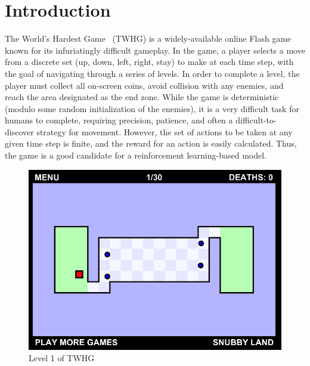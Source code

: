 \documentclass[12pt]{article}
\begin{document}
\section{Introduction}


The World's Hardest Game~\cite{game} (TWHG) is a widely-available online Flash game known for its infuriatingly difficult gameplay. In the game, a player selects a move from a discrete set (up, down, left, right, stay) to make at each time step, with the goal of navigating through a series of levels. In order to complete a level, the player must collect all on-screen coins, avoid collision with any enemies, and reach the area designated as the end zone. While the game is deterministic (modulo some random initialization of the enemies), it is a very difficult task for humans to complete, requiring precision, patience, and often a difficult-to-discover strategy for movement. However, the set of actions to be taken at any given time step is finite, and the reward for an action is easily calculated. Thus, the game is a good candidate for a reinforcement learning-based model.

\begin{figure}[H]
  \includegraphics[width=1\textwidth]{report/hardest_game}
  \caption{Level 1 of TWHG}
  \label{fig:twhg}
  \centering
\end{figure}
\end{document}
